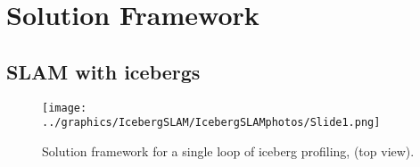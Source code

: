 \section{Solution Framework}

\subsection{SLAM with icebergs}

\begin{figure}[htb]
   \centering
   \texttt{[image: ../graphics/IcebergSLAM/IcebergSLAMphotos/Slide1.png]} %
   \caption{Solution framework for a single loop of iceberg profiling, (top view). }
   \label{fig:icebergSLAM}
\end{figure}


